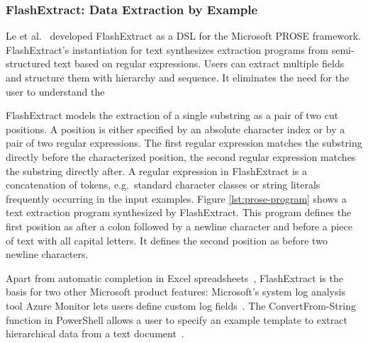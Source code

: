 

\subsubsection{FlashExtract: Data Extraction by Example}
Le et al.~\cite{le2014flashextract:} developed FlashExtract as a DSL
for the Microsoft PROSE framework.
FlashExtract's instantiation for text synthesizes extraction programs
from semi-structured text based on regular expressions.
Users can
extract multiple fields and structure them with hierarchy and
sequence.
It eliminates the need for the user to understand the

FlashExtract models the extraction of a single substring as a pair of
two cut positions.
A position is either specified by an absolute
character index or by a pair of two regular expressions.
The first
regular expression matches the substring directly before the
characterized position, the second regular expression matches the
substring directly after.
A regular expression in FlashExtract is a
concatenation of tokens, e.g.\ standard character classes or string
literals frequently occurring in the input examples.
Figure
\ref{lst:prose-program} shows a text extraction program synthesized by
FlashExtract.
This program defines the first position as after a colon
followed by a newline character and before a piece of text with all
capital letters.
It defines the second position as before two newline
characters.

Apart from automatic completion in Excel
spreadsheets~\cite{excel2019flashfill}, FlashExtract is the basis for
two other Microsoft product features: Microsoft's system log analysis
tool Azure Monitor lets users define custom log
fields~\cite{azure2019custom}.
The ConvertFrom-String function in
PowerShell allows a user to specify an example template to extract
hierarchical data from a text document~\cite{powershell2019convert}.

